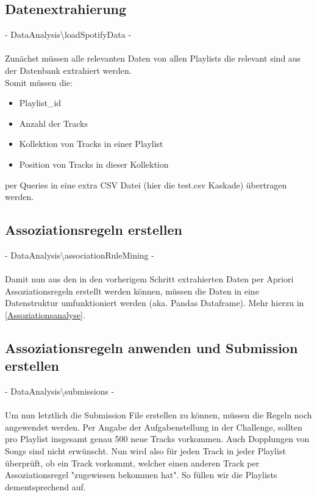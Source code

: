 \documentclass[12pt]{article}
\begin{document}
\subsection{Datenextrahierung}
- \color{mygray}DataAnalysis\textbackslash loadSpotifyData \color{black} - \\\\
Zunächst müssen alle relevanten Daten von allen Playlists die relevant sind aus der Datenbank extrahiert werden.\\
Somit müssen die: 
\begin{itemize}
    \item Playlist\_id
    \item Anzahl der Tracks
    \item Kollektion von Tracks in einer Playlist
    \item Position von Tracks in dieser Kollektion
\end{itemize}
per Queries in eine extra CSV Datei (hier die test.csv Kaskade) übertragen werden.
\\

\subsection{Assoziationsregeln erstellen}
 - \color{mygray}DataAnalysis\textbackslash associationRuleMining \color{black} - \\\\
Damit nun aus den in den vorherigem Schritt extrahierten Daten per Apriori Assoziationsregeln erstellt werden können, müssen die Daten in eine Datenstruktur
umfunktioniert werden (aka. Pandas Dataframe). Mehr hierzu in \ref{Assoziationsanalyse}.

\subsection{Assoziationsregeln anwenden und Submission erstellen} 
 - \color{mygray}DataAnalysis\textbackslash submissions \color{black} -\\\\
Um nun letztlich die Submission File erstellen zu können, müssen die Regeln noch angewendet werden. Per Angabe der Aufgabenstellung in der Challenge,
sollten pro Playlist insgesamt \color{mygreen}genau 500 neue Tracks \color{black} vorkommen. Auch Dopplungen von Songs sind nicht erwünscht. Nun wird also für jeden Track in jeder Playlist überprüft, ob ein Track vorkommt, welcher einen anderen Track per Assoziationsregel "zugewiesen bekommen hat". So füllen wir die Playlists dementsprechend auf.
\end{document}
